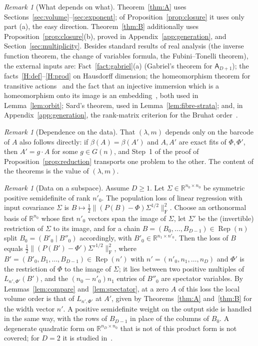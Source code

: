 \documentclass[11pt,a4paper]{article}
\theoremstyle{definition}
\theoremstyle{remark}
\newtheorem{remark}[theorem]{Remark}
\numberwithin{equation}{section}
\newcommand{\R}{\mathbb{R}}
\newcommand{\Rep}{\operatorname{Rep}}
\newcommand{\Fr}[1]{\lVert #1\rVert_{\mathrm F}}
\begin{document}
\begin{remark}[What depends on what]\label{rem:dependencies}
Theorem~\ref{thm:A} uses Sections~\ref{sec:volume}--\ref{sec:exponent}; of Proposition~\ref{prop:closure} it uses only part (a), the easy direction. Theorem~\ref{thm:B} additionally uses Proposition~\ref{prop:closure}(b), proved in Appendix~\ref{app:generation}, and Section~\ref{sec:multiplicity}. Besides standard results of real analysis (the inverse function theorem, the change of variables formula, the Fubini--Tonelli theorem), the external inputs are: Fact~\ref{fact:gabriel}(a) (Gabriel's theorem for $\mathsf A_{D+1}$); the facts~\ref{H:def}--\ref{H:prod} on Hausdorff dimension; the homeomorphism theorem for transitive actions~\cite{helgason} and the fact that an injective immersion which is a homeomorphism onto its image is an embedding~\cite{lee}, both used in Lemma~\ref{lem:orbit}; Sard's theorem, used in Lemma~\ref{lem:fibre-strata}; and, in Appendix~\ref{app:generation}, the rank-matrix criterion for the Bruhat order~\cite{bjorner-brenti}.
\end{remark}

\begin{remark}[Dependence on the data]\label{rem:invariance}
That $(\lambda,m)$ depends only on the barcode of $A$ also follows directly: if $\beta(A)=\beta(A')$ and $A,A'$ are exact fits of $\Phi,\Phi'$, then $A'=g\cdot A$ for some $g\in G(n)$, and Step~1 of the proof of Proposition~\ref{prop:reduction} transports one problem to the other. The content of the theorems is the value of $(\lambda,m)$.
\end{remark}

\begin{remark}[Data on a subspace]\label{rem:covariance}
Assume $D\ge1$. Let $\Sigma\in\R^{n_0\times n_0}$ be symmetric positive semidefinite of rank $n'_0$. The population loss of linear regression with input covariance $\Sigma$ is $B\mapsto\frac{1}{2}\Fr{(P(B)-\Phi)\Sigma^{1/2}}^2$. Choose an orthonormal basis of $\R^{n_0}$ whose first $n'_0$ vectors span the image of $\Sigma$, let $\Sigma'$ be the (invertible) restriction of $\Sigma$ to its image, and for a chain $B=(B_0,\dots,B_{D-1})\in\Rep(n)$ split $B_0=(B'_0\mid B''_0)$ accordingly, with $B'_0\in\R^{n_1\times n'_0}$. Then the loss of $B$ equals $\frac{1}{2}\Fr{(P(B')-\Phi')\Sigma'^{1/2}}^2$, where $B'=(B'_0,B_1,\dots,B_{D-1})\in\Rep(n')$ with $n'=(n'_0,n_1,\dots,n_D)$ and $\Phi'$ is the restriction of $\Phi$ to the image of $\Sigma$; it lies between two positive multiples of $L_{n',\Phi'}(B')$, and the $(n_0-n'_0)n_1$ entries of $B''_0$ are spectator variables. By Lemmas~\ref{lem:compare} and~\ref{lem:spectator}, at a zero $A$ of this loss the local volume order is that of $L_{n',\Phi'}$ at $A'$, given by Theorems~\ref{thm:A} and~\ref{thm:B} for the width vector $n'$. A positive semidefinite weight on the output side is handled in the same way, with the rows of $B_{D-1}$ in place of the columns of $B_0$. A degenerate quadratic form on $\R^{n_D\times n_0}$ that is not of this product form is not covered; for $D=2$ it is studied in~\cite{ferry-monod-yano}.
\end{remark}
\end{document}

